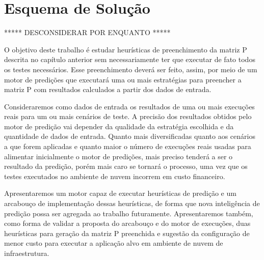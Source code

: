 \chapter[Esquema de Solução]{Esquema de Solução}

***** DESCONSIDERAR POR ENQUANTO *****

O objetivo deste trabalho é estudar heurísticas de preenchimento da matriz P 
descrita no capítulo anterior sem necessariamente ter que executar de fato todos
os testes necessários. Esse preenchimento deverá ser feito, assim, por meio de 
um motor de predições que executará uma ou mais estratégias para preencher a 
matriz P com resultados calculados a partir dos dados de entrada.

Consideraremos como dados de entrada os resultados de uma ou mais execuções 
reais para um ou mais cenários de teste. A precisão dos resultados obtidos pelo 
motor de predição vai depender da qualidade da estratégia escolhida e da 
quantidade de dados de entrada. Quanto mais diversificadas quanto aos cenários a
que forem aplicadas e quanto maior o número de execuções reais usadas para 
alimentar inicialmente o motor de predições, mais preciso tenderá a ser o 
resultado da predição, porém mais caro se tornará o processo, uma vez que os 
testes executados no ambiente de nuvem incorrem em custo financeiro.

Apresentaremos um motor capaz de executar heurísticas de predição e um arcabouço
de implementação dessas heurísticas, de forma que nova inteligência de predição 
possa ser agregada ao trabalho futuramente. Apresentaremos também, como forma de
validar a proposta do arcabouço e do motor de execuções, duas heurísticas para 
geração da matriz P preenchida e sugestão da configuração de menor custo para 
executar a aplicação alvo em ambiente de nuvem de infraestrutura.

